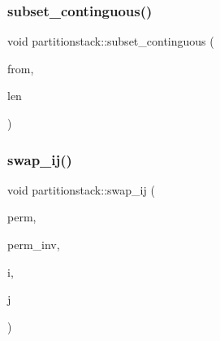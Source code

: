 \mbox{\label{classpartitionstack_a9a58475ddfa123b384ff187b290fa37c}} 
\subsubsection{\texorpdfstring{subset\+\_\+continguous()}{subset\_continguous()}}
{\footnotesize\ttfamily void partitionstack\+::subset\+\_\+continguous (\begin{DoxyParamCaption}\item[{\mbox{\hyperlink{galois_8h_a09fddde158a3a20bd2dcadb609de11dc}{I\+NT}}}]{from,  }\item[{\mbox{\hyperlink{galois_8h_a09fddde158a3a20bd2dcadb609de11dc}{I\+NT}}}]{len }\end{DoxyParamCaption})}

\mbox{\label{classpartitionstack_a9b1d34fca91b9736a27af68df0723d6f}} 
\subsubsection{\texorpdfstring{swap\+\_\+ij()}{swap\_ij()}}
{\footnotesize\ttfamily void partitionstack\+::swap\+\_\+ij (\begin{DoxyParamCaption}\item[{\mbox{\hyperlink{galois_8h_a09fddde158a3a20bd2dcadb609de11dc}{I\+NT}} $\ast$}]{perm,  }\item[{\mbox{\hyperlink{galois_8h_a09fddde158a3a20bd2dcadb609de11dc}{I\+NT}} $\ast$}]{perm\+\_\+inv,  }\item[{\mbox{\hyperlink{galois_8h_a09fddde158a3a20bd2dcadb609de11dc}{I\+NT}}}]{i,  }\item[{\mbox{\hyperlink{galois_8h_a09fddde158a3a20bd2dcadb609de11dc}{I\+NT}}}]{j }\end{DoxyParamCaption})}

\mbox{\label{classpartitionstack_a8a9af82af9d5264589ec60792757901d}} 
